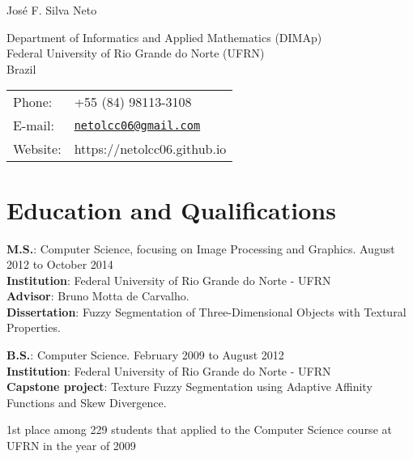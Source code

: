 \documentclass[letterpaper]{article}
\def\name{Jos\'e F. Silva Neto}
\renewenvironment{itemize}{
  \begin{list}{}{
      \setlength{\leftmargin}{1.5em}
    }
  }{
  \end{list}
}
\begin{document}
{\huge \name}


\vspace{0.25in}

\begin{minipage}{0.75\linewidth}
  Department of Informatics and Applied Mathematics (DIMAp)\\
  Federal University of Rio Grande do Norte (UFRN)\\
  Brazil
\end{minipage}
\begin{minipage}{0.45\linewidth}
  \begin{tabular}{ll}
    Phone: & +55 (84) 98113-3108 \\
    E-mail: & \href{mailto:netolcc06@gmail.com}{\tt netolcc06@gmail.com} \\
    Website: & https://netolcc06.github.io
  \end{tabular}
\end{minipage}



\section*{Education and Qualifications}

\begin{itemize}
  
 \item[$\bullet$] \textbf{M.S.}: Computer Science, focusing on Image Processing and Graphics. August 2012 to October 2014 \\
    \textbf{Institution}: Federal University of Rio Grande do Norte - UFRN\\
    \textbf{Advisor}: Bruno Motta de Carvalho.\\
    \textbf{Dissertation}:  Fuzzy Segmentation of Three-Dimensional Objects with Textural Properties.
  
  \item[$\bullet$] \textbf{B.S.}: Computer Science. February 2009 to August 2012 \\
  \textbf{Institution}: Federal University of Rio Grande do Norte - UFRN \\
  \textbf{Capstone project}: Texture Fuzzy Segmentation using Adaptive Affinity Functions and Skew Divergence.


  \item[$\bullet$] 1st place among 229 students that applied to the Computer Science course at UFRN in the year of 2009
  
\end{itemize}
\end{document}
